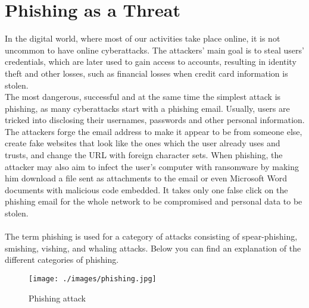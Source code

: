 \chapter{Phishing as a Threat}
In the digital world, where most of our activities take place online, it is not uncommon to have online cyberattacks. 
The attackers’ main goal is to steal users’ credentials, which are later used to gain access to accounts, resulting in identity theft and other losses, such as financial losses when credit card information is stolen. \\
The most dangerous, successful and at the same time the simplest attack is phishing, as many cyberattacks start with a phishing email. 
Usually, users are tricked into disclosing their usernames, passwords and other personal information. 
The attackers forge the email address to make it appear to be from someone else, create fake websites that look like the ones which the user already uses and trusts, and change the URL with foreign character sets. 
When phishing, the attacker may also aim to infect the user's computer with ransomware by making him download a file sent as attachments to the email or even Microsoft Word documents with malicious code embedded. 
It takes only one false click on the phishing email for the whole network to be compromised and personal data to be stolen. 
\\
\\ The term phishing is used for a category of attacks consisting of spear-phishing, smishing, vishing, and whaling attacks. Below you can find an explanation of the different categories of phishing.

\begin{figure}[H]
    \centering
    \texttt{[image: ./images/phishing.jpg]}
    \caption{Phishing attack} 
\end{figure}

